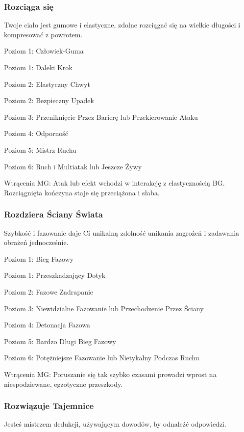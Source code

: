 \subsubsection{Rozciąga się}

Twoje ciało jest gumowe i elastyczne, zdolne rozciągać się na wielkie długości i kompresować z powrotem.

Poziom 1: Człowiek-Guma

Poziom 1: Daleki Krok

Poziom 2: Elastyczny Chwyt

Poziom 2: Bezpieczny Upadek

Poziom 3: Przeniknięcie Przez Barierę lub  Przekierowanie Ataku

Poziom 4: Odporność

Poziom 5: Mistrz Ruchu

Poziom 6: Ruch i Multiatak lub Jeszcze Żywy

Wtrącenia MG: Atak lub efekt wchodzi w interakcję z elastycznością BG. Rozciągnięta kończyna staje się przeciążona i słaba. 

\subsubsection{Rozdziera Ściany Świata}

Szybkość i fazowanie daje Ci unikalną zdolność unikania zagrożeń i zadawania obrażeń jednocześnie. 

Poziom 1: Bieg Fazowy

Poziom 1: Przeszkadzający Dotyk

Poziom 2: Fazowe Zadrapanie

Poziom 3: Niewidzialne Fazowanie lub Przechodzenie Przez Ściany

Poziom 4: Detonacja Fazowa

Poziom 5: Bardzo Długi Bieg Fazowy

Poziom 6: Potężniejsze Fazowanie lub Nietykalny Podczas Ruchu

Wtrącenia MG: Poruszanie się tak szybko czasami prowadzi wprost na niespodziewane, egzotyczne przeszkody.

\subsubsection{Rozwiązuje Tajemnice}

Jesteś mistrzem dedukcji, używającym dowodów, by odnaleźć odpowiedzi.

